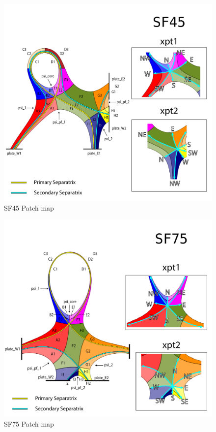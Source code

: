 \begin{figure}[H]
    \centering
        \includegraphics[width=\textwidth]{figures/configurations/SF45_collection.pdf}
        \caption{SF45 Patch map}
        \label{fig:sf45_patch_map}
\end{figure}
\begin{figure}[H]
    \centering
        \includegraphics[width=\textwidth]{figures/configurations/SF75_collection.pdf}
        \caption{SF75 Patch map}
        \label{fig:sf75_patch_map}
\end{figure}
